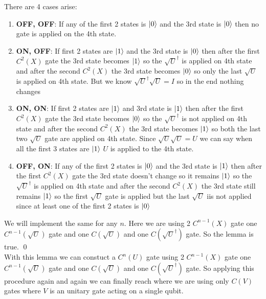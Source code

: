 \documentclass[a4paper, 11pt]{article}
\renewenvironment{proof}{\noindent{\it \textbf{Proof:}}\hspace*{1em}}{\qed\bigskip\\}
\begin{document}
{\begin{proof}
	There are 4 cases arise: \begin{enumerate}
		\item \textbf{OFF, OFF}: If any of the first 2 states is  $\ket{0}$ and the 3rd state is $\ket{0}$ then no gate is applied on the 4th state. 
		\item \textbf{ON, OFF}: If first 2 states are $\ket{1}$ and the 3rd state is $\ket{0}$ then after the first $C^2(X)$ gate the 3rd state becomes $\ket{1}$ so the $\sqrt{U}^{\dagger}$ is applied  on 4th state and after the second $C^2(X)$ the 3rd state becomes $\ket{0}$ so only the last $\sqrt{U}$ is applied on 4th state. But we know $\sqrt{U}^{\dagger}\sqrt{U}=I$ so in the end nothing changes
		\item \textbf{ON, ON}: If first 2 states are $\ket{1}$ and 3rd state is $\ket{1}$ then after the first $C^2(X)$ gate the 3rd state becomes $\ket{0}$ so the $\sqrt{U}^{\dagger}$ is not applied  on 4th state and after the second $C^2(X)$ the 3rd state becomes $\ket{1}$ so both  the last two $\sqrt{U}$ gate are applied on 4th state. Since $\sqrt{U}\sqrt{U}=U$ we can say when all the first 3 states are $\ket{1}$ $U$ is applied to the 4th state.
		\item \textbf{OFF, ON}: If any of the first 2 states is $\ket{0}$ and the 3rd state is $\ket{1}$ then after the first $C^2(X)$ gate the 3rd state doesn't change so it remains $\ket{1}$ so the $\sqrt{U}^{\dagger}$ is  applied  on 4th state and after the second $C^2(X)$ the 3rd state still remains  $\ket{1}$ so the first $\sqrt{U}$ gate is applied but the last $\sqrt{U}$ iis not applied since at least one of the first 2 states is $\ket{0}$
	\end{enumerate}
	We will implement the same for any $n$. Here we are using 2 $C^{n-1}(X)$ gate one $C^{n-1}(\sqrt{U})$ gate and one $C(\sqrt{U})$ and one $C(\sqrt{U}^{\dagger})$ gate. So the lemma is true.
	\end{proof}
	With this lemma we can constuct a $C^n(U)$ gate using 2 $C^{n-1}(X)$ gate one $C^{n-1}(\sqrt{U})$ gate and one $C(\sqrt{U})$ and one $C(\sqrt{U}^{\dagger})$ gate. So applying this procedure again and again we can finally reach where we are using only $C(V)$ gates where $V$ is an unitary gate acting on a single qubit.
	
}
\end{document}
